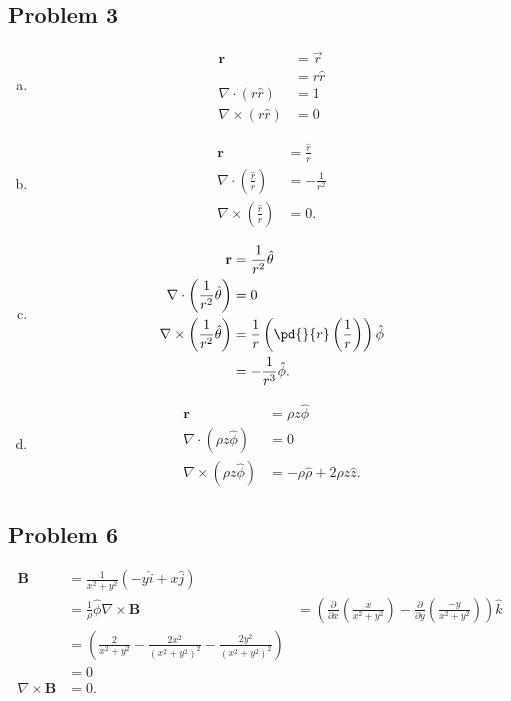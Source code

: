 \documentclass[10pt]{mypackage}
\begin{document}
\subsection{Problem 3}%
\begin{enumerate}[(a)]
  \item 
    \begin{align*}
      \mathbf{r} &= \vec{r}\\
                 &= r\hat{r}\\
      \nabla \cdot \left(r\hat{r}\right) &= 1\\
      \nabla \times \left(r\hat{r}\right) &= 0
    \end{align*}
  \item 
    \begin{align*}
      \mathbf{r} &= \frac{\hat{r}}{r}\\
      \nabla \cdot \left(\frac{\hat{r}}{r}\right) &= -\frac{1}{r^2}\\
      \nabla \times \left(\frac{\hat{r}}{r}\right) &= 0.
    \end{align*}
  \item 
    \begin{align*}
      \mathbf{r} &= \frac{1}{r^2}\hat{\theta}\\
      \nabla \cdot \left(\frac{1}{r^2}\hat{\theta}\right) &= 0\\
      \nabla \times \left(\frac{1}{r^2}\hat{\theta}\right) &= \frac{1}{r}\left(\pd{}{r}\left(\frac{1}{r}\right)\right)\hat{\phi}\\
                                                           &= -\frac{1}{r^3}\hat{\phi}.
    \end{align*}
  \item 
    \begin{align*}
      \mathbf{r} &= \rho z \hat{\phi}\\
      \nabla \cdot \left(\rho z \hat{\phi}\right) &= 0\\
      \nabla \times \left(\rho z \hat{\phi}\right) &= -\rho \hat{\rho} + 2\rho z \hat{z}.
    \end{align*}
\end{enumerate}
\subsection{Problem 6}%
\begin{align*}
  \mathbf{B} &= \frac{1}{x^2 + y^2}\left(-y\hat{i} + x\hat{j}\right)\\
             &= \frac{1}{\rho}\hat{\phi}
  \nabla \times \mathbf{B} &= \left(\frac{\partial}{\partial x}\left(\frac{x}{x^2 + y^2}\right) - \frac{\partial}{\partial y}\left(\frac{-y}{x^2 + y^2}\right)\right)\hat{k}\\
                           &= \left(\frac{2}{x^2 + y^2} - \frac{2x^2}{\left(x^2 + y^2\right)^2} - \frac{2y^2}{\left(x^2 + y^2\right)^2}\right)\\
                           &= 0\\
  \nabla \times \mathbf{B} &= 0.
\end{align*}
\end{document}
